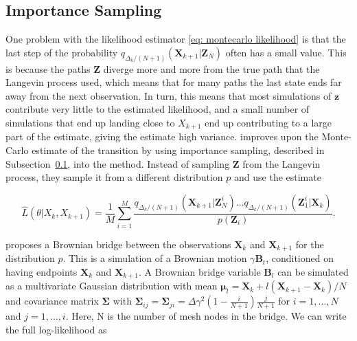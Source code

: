 \subsection{Importance Sampling}
\label{subsec: importance sampling}
One problem with the likelihood estimator \eqref{eq: montecarlo likelihood} is that the last step of the probability $q_{\Delta_k/(N+1)}(\textbf{X}_{k+1}|\textbf{Z}_N)$ often has a small value. This is because the paths $\textbf{Z}$ diverge more and more from the true path that the Langevin process used, which means that for many paths the last state ends far away from the next observation. In turn, this means that most simulations of $\textbf{z}$ contribute very little to the estimated likelihood, and a small number of simulations that end up landing close to $X_{k+1}$ end up contributing to a large part of the estimate, giving the estimate high variance. \textcite{durham_numerical_2002} improves upon the Monte-Carlo estimate of the transition by using importance sampling, described in Subsection~\ref{subsec: importance sampling}, into the method. Instead of sampling $\textbf{Z}$ from the Langevin process, they sample it from a different distribution $p$ and use the estimate

\begin{equation}
\hat{L}(\theta|X_k, X_{k+1}) = \frac{1}{M}\sum_{i=1}^M \frac{q_{\Delta_k/(N+1)}(\textbf{X}_{k+1}|\textbf{Z}^i_N)\dots q_{\Delta_k/(N+1)}(\textbf{Z}^i_1|\textbf{X}_k)}{p(\textbf{Z}_i)}.
\label{eq: importance sampling likelihood}
\end{equation}


\textcite{durham_numerical_2002} proposes a Brownian bridge between the observations $\textbf{X}_k$ and $\textbf{X}_{k+1}$ for the distribution $p$. This is a simulation of a Brownian motion $\gamma \textbf{B}_t$, conditioned on having endpoints $\textbf{X}_k$ and $\textbf{X}_{k+1}$. A Brownian bridge variable $\textbf{B}_l$ can be simulated as a multivariate Gaussian distribution with mean $\bm \mu_l = \textbf{X}_k + l(\textbf{X}_{k+1}-\textbf{X}_k)/N$ and covariance matrix $\bm \Sigma$ with $\bm \Sigma_{ij} = \bm \Sigma_{ji}= \Delta \gamma^2(1-\frac{i}{N+1}) \frac{j}{N+1}$ for $i = 1, \dots , N$ and $j = 1, \dots, i$. Here, N is the number of mesh nodes in the bridge. We can write the full log-likelihood as 


